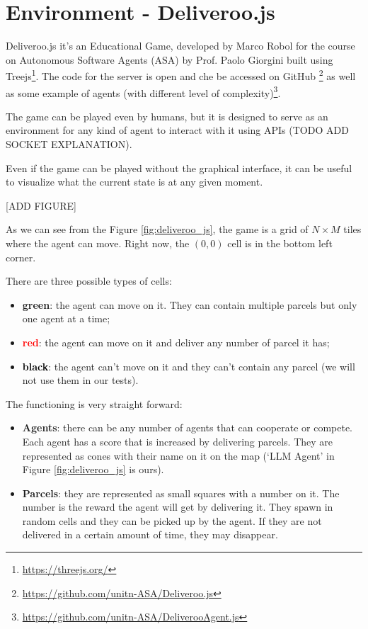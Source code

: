 \section{Environment - Deliveroo.js}
\label{sec:environment_deliveroo_js}

Deliveroo.js it's an Educational Game, developed by Marco Robol for the course on
Autonomous Software Agents (ASA) by Prof. Paolo Giorgini built using Treejs\footnote{\url{https://threejs.org/}}.
The code for the server is open and che be accessed on GitHub \footnote{\url{https://github.com/unitn-ASA/Deliveroo.js}}
as well as some example of agents (with different level of complexity)\footnote{\url{https://github.com/unitn-ASA/DeliverooAgent.js}}.

The game can be played even by humans, but it is designed to serve as an
environment for any kind of agent to interact with it using APIs (TODO ADD SOCKET
EXPLANATION).

Even if the game can be played without the graphical interface, it can be useful
to visualize what the current state is at any given moment.

[ADD FIGURE] \label{fig:deliveroo_js}

As we can see from the Figure \ref{fig:deliveroo_js}, the game is a grid of $N \times
M$ tiles where the agent can move. Right now, the $(0, 0)$ cell is in the bottom
left corner.

There are three possible types of cells:
\begin{itemize}
  \item \textcolor{primary}{\textbf{green}}: the agent can move on it. They can
    contain multiple parcels but only one agent at a time;

  \item \textcolor{red}{\textbf{red}}: the agent can move on it and deliver any number
    of parcel it has;

  \item \textcolor{black}{\textbf{black}}: the agent can't move on it and they can't
    contain any parcel (we will not use them in our tests).
\end{itemize}

The functioning is very straight forward:

\begin{itemize}
  \item \textbf{Agents}: there can be any number of agents that can cooperate or
    compete. Each agent has a score that is increased by delivering parcels. They
    are represented as cones with their name on it on the map (`LLM Agent' in
    Figure \ref{fig:deliveroo_js} is ours).

  \item \textbf{Parcels}: they are represented as small squares with a number on
    it. The number is the reward the agent will get by delivering it. They spawn
    in random cells and they can be picked up by the agent. If they are not
    delivered in a certain amount of time, they may disappear.
\end{itemize}

